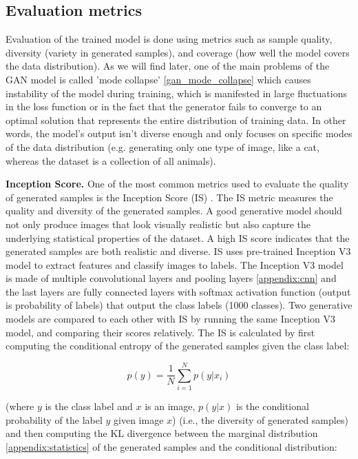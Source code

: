 \subsection{Evaluation metrics}

Evaluation of the trained model is done using metrics such as sample quality, diversity (variety in generated samples), and coverage (how well the model covers the data distribution). As we will find later, one of the main problems of the GAN model is called 'mode collapse' \ref{gan_mode_collapse} which causes instability of the model during training, which is manifested in large fluctuations in the loss function or in the fact that the generator fails to converge to an optimal solution that represents the entire distribution of training data. In other words, the model's output isn't diverse enough and only focuses on specific modes of the data distribution (e.g. generating only one type of image, like a cat, whereas the dataset is a collection of all animals).





\textbf{Inception Score.} One of the most common metrics used to evaluate the quality of generated samples is the Inception Score (IS) \cite{is_score}. The IS metric measures the quality and diversity of the generated samples. A good generative model should not only produce images that look visually realistic but also capture the underlying statistical properties of the dataset. A high IS score indicates that the generated samples are both realistic and diverse. IS uses pre-trained Inception V3 model \cite{inception_v3_model} to extract features and classify images to labels. The Inception V3 model is made of multiple convolutional layers and pooling layers \ref{appendix:cnn} and the last layers are fully connected layers with softmax activation function (output is probability of labels) that output the class labels (1000 classes). Two generative models are compared to each other with IS by running the same Inception V3 model, and comparing their scores relatively. The IS is calculated by first computing the conditional entropy of the generated samples given the class label: 

\[
    p(y) = \frac{1}{N} \sum_{i=1}^{N} p(y|x_i)
\] 

(where $y$ is the class label and $x$ is an image, $p(y|x)$ is the conditional probability of the label $y$ given image $x$) (i.e., the diversity of generated samples) and then computing the KL divergence between the marginal distribution \ref{appendix:statistics} of the generated samples and the conditional distribution:

